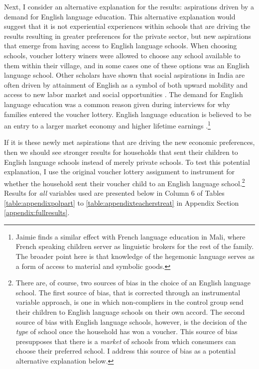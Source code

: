 \documentclass[hidelinks, 12pt, titlepage]{article}
\begin{document}
			Next, I consider an alternative explanation for the results: aspirations driven by a demand for English language education.  This alternative explanation would suggest that it is not experiential experiences within schools that are driving the results resulting in greater preferences for the private sector, but new aspirations that emerge from having access to English language schools.  When choosing schools, voucher lottery winers were allowed to choose any school available to them within their village, and in some cases one of these options was an English language school.  Other scholars have shown that social aspirations in India are often driven by attainment of English as a symbol of both upward mobility and access to new labor market and social opportunities \citep{Lukose2009}.  The demand for English language education was a common reason given during interviews for why families entered the voucher lottery.  English language education is believed to be an entry to a larger market economy and higher lifetime earnings \citep{Fernandes2008, Kapur2010,Lukose2009, Ohara2012}.\footnote{Jaimie \cite{Bleck2015} finds a similar effect with French language education in Mali, where French speaking children server as linguistic brokers for the rest of the family.  The broader point here is that knowledge of the hegemonic language serves as a form of access to material and symbolic goods.}

			If it is these newly met aspirations that are driving the new economic preferences, then we should see stronger results for households that sent their children to English language schools instead of merely private schools.  To test this potential explanation, I use the original voucher lottery assignment to instrument for whether the household sent their voucher child to an English language school.\footnote{There are, of course, two sources of bias in the choice of an English language school.  The first source of bias, that is corrected through an instrumental variable approach, is one in which non-compliers in the control group send their children to English language schools on their own accord.  The second source of bias with English language schools, however, is the decision of the \emph{type} of school once the household has won a voucher.  This source of bias presupposes that there is a \emph{market} of schools from which consumers can choose their preferred school.  I address this source of bias as a potential alternative explanation below.}  Results for \emph{all} variables used are presented below in Column 6 of Tables \ref{table:appendixpolpart} to \ref{table:appendixteacherstreat} in Appendix Section \ref{appendix:fullresults}.
\end{document}
